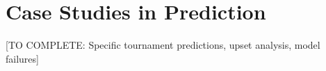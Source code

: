 \section{Case Studies in Prediction}

[TO COMPLETE: Specific tournament predictions, upset analysis, model failures]